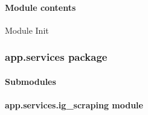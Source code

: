 \documentclass[letterpaper,10pt,english]{sphinxmanual}
\begin{document}
\paragraph{Module contents}
\label{\detokenize{app.schema:module-app.schema}}\label{\detokenize{app.schema:module-contents}}
\sphinxAtStartPar
Module Init

\sphinxstepscope


\subsubsection{app.services package}
\label{\detokenize{app.services:app-services-package}}\label{\detokenize{app.services::doc}}

\paragraph{Submodules}
\label{\detokenize{app.services:submodules}}

\paragraph{app.services.ig\_scraping module}
\label{\detokenize{app.services:module-app.services.ig_scraping}}\label{\detokenize{app.services:app-services-ig-scraping-module}}
\end{document}
